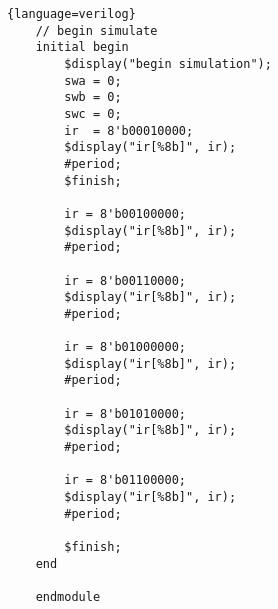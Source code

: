 \begin{lstlisting}{language=verilog}
    // begin simulate
    initial begin
        $display("begin simulation");
        swa = 0;
        swb = 0;
        swc = 0;
        ir  = 8'b00010000;
        $display("ir[%8b]", ir);
        #period;
        $finish;

        ir = 8'b00100000;
        $display("ir[%8b]", ir);
        #period;

        ir = 8'b00110000;
        $display("ir[%8b]", ir);
        #period;

        ir = 8'b01000000;
        $display("ir[%8b]", ir);
        #period;

        ir = 8'b01010000;
        $display("ir[%8b]", ir);
        #period;

        ir = 8'b01100000;
        $display("ir[%8b]", ir);
        #period;

        $finish;
    end

    endmodule

\end{lstlisting}